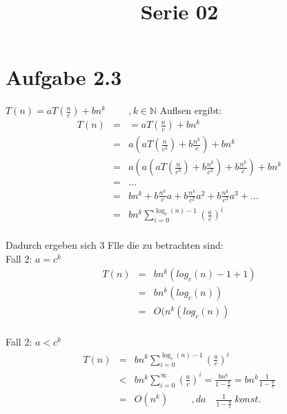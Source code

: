 
\title{Serie 02}


\section*{Aufgabe 2.3}

  	$ T(n) = a T(\frac{n}{c}) + b n^{k} \hspace{1cm},k \in\mathbb{N} $
  	\newline
  	Aufl\ouml sen ergibt:\\
  \begin{eqnarray}
  T(n) &=& = aT(\frac{n}{c}) + bn^{k}\\
  &=& a ( aT(\frac{n}{c^{2}}) + b\frac{n^{k}}{c} ) + b n^{k}\\
  &=& a (a ( aT(\frac{n}{c^{3}}) + b \frac{n^{k}}{c^{2}} ) + b \frac{n^{k}}{c} ) + b n^{k}\\
  &=& ...\\
  &=& bn^{k} + b \frac{n^{k}}{c}a + b \frac{n^{k}}{c^{2}}a^{2} + b \frac{n^{k}}{c^{3}}a^{3} + ...\\
  &=& bn^{k} \sum\limits_{i=0}^{\log_{c}(n) - 1}{({\frac{a}{c}})}^{i}\\
  \end{eqnarray}

  Dadurch ergeben sich 3 F\auml lle die zu betrachten sind:\\

  Fall 2: $a = c^{k}$
  \begin{eqnarray}
  T(n) &=& bn^{k}(log_{c}(n) - 1 + 1)\\
  &=& bn^{k}(log_{c}(n))\\
  &=& O (n^{k}(log_{c}(n))\\
  \end{eqnarray}


  Fall 2: $a < c^{k}$
  \begin{eqnarray}
  T(n) &=& bn^{k} \sum\limits_{i=0}^{\log_{c}(n) - 1}{({\frac{a}{c}})}^{i}\\
  &<& bn^{k} \sum\limits_{i=0}^{\infty}{({\frac{a}{c}})}^{i} = \frac{bn^{k}}{1- \frac{a}{c}} = bn^{k} \frac{1}{1- \frac{a}{c}}\\
  &=& O (n^{k}) \hspace{1cm}, da \quad\frac{1}{1- \frac{a}{c}} \ konst.\\
  \end{eqnarray}


